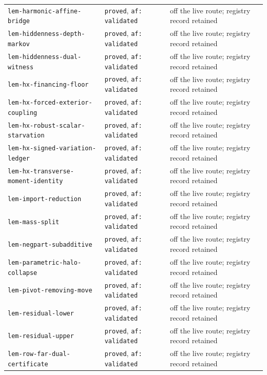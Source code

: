 \begin{longtable}{@{}p{}p{}p{}@{}}
\texttt{lem-harmonic-affine-bridge} & \texttt{proved}, \texttt{af: validated} & off the live route; registry record retained \\
\texttt{lem-hiddenness-depth-markov} & \texttt{proved}, \texttt{af: validated} & off the live route; registry record retained \\
\texttt{lem-hiddenness-dual-witness} & \texttt{proved}, \texttt{af: validated} & off the live route; registry record retained \\
\texttt{lem-hx-financing-floor} & \texttt{proved}, \texttt{af: validated} & off the live route; registry record retained \\
\texttt{lem-hx-forced-exterior-coupling} & \texttt{proved}, \texttt{af: validated} & off the live route; registry record retained \\
\texttt{lem-hx-robust-scalar-starvation} & \texttt{proved}, \texttt{af: validated} & off the live route; registry record retained \\
\texttt{lem-hx-signed-variation-ledger} & \texttt{proved}, \texttt{af: validated} & off the live route; registry record retained \\
\texttt{lem-hx-transverse-moment-identity} & \texttt{proved}, \texttt{af: validated} & off the live route; registry record retained \\
\texttt{lem-import-reduction} & \texttt{proved}, \texttt{af: validated} & off the live route; registry record retained \\
\texttt{lem-mass-split} & \texttt{proved}, \texttt{af: validated} & off the live route; registry record retained \\
\texttt{lem-negpart-subadditive} & \texttt{proved}, \texttt{af: validated} & off the live route; registry record retained \\
\texttt{lem-parametric-halo-collapse} & \texttt{proved}, \texttt{af: validated} & off the live route; registry record retained \\
\texttt{lem-pivot-removing-move} & \texttt{proved}, \texttt{af: validated} & off the live route; registry record retained \\
\texttt{lem-residual-lower} & \texttt{proved}, \texttt{af: validated} & off the live route; registry record retained \\
\texttt{lem-residual-upper} & \texttt{proved}, \texttt{af: validated} & off the live route; registry record retained \\
\texttt{lem-row-far-dual-certificate} & \texttt{proved}, \texttt{af: validated} & off the live route; registry record retained \\

\end{longtable}

